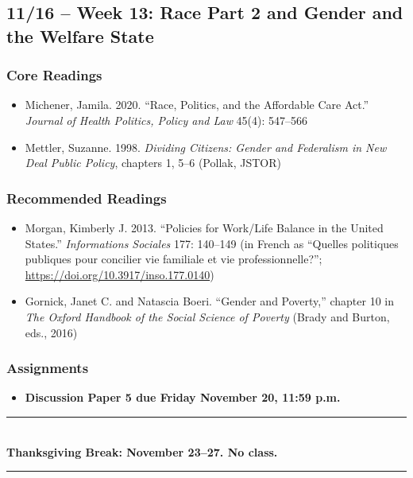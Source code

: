 \documentclass[12pt]{article}
\begin{document}
\subsection*{11/16 -- Week 13: Race Part 2 and Gender and the Welfare State}
    \subsubsection*{Core Readings}
        \begin{itemize}
            \item Michener, Jamila. 2020. ``Race, Politics, and the Affordable Care Act.'' \emph{Journal of Health Politics, Policy and Law} 45(4): 547--566
            \item Mettler, Suzanne. 1998. \emph{Dividing Citizens: Gender and Federalism in New Deal Public Policy}, chapters 1, 5--6 (Pollak, JSTOR)
        \end{itemize}
    \subsubsection*{Recommended Readings}
        \begin{itemize}
            \item Morgan, Kimberly J. 2013. ``Policies for Work/Life Balance in the United States.'' \emph{Informations Sociales} 177: 140--149 (in French as ``Quelles politiques publiques pour concilier vie familiale et vie professionnelle?''; \url{https://doi.org/10.3917/inso.177.0140})
            \item Gornick, Janet C. and Natascia Boeri. ``Gender and Poverty,'' chapter 10 in \emph{The Oxford Handbook of the Social Science of Poverty} (Brady and Burton, eds., 2016)
        \end{itemize}
    \subsubsection*{Assignments}
        \begin{itemize}
            \item \textbf{Discussion Paper 5 due Friday November 20, 11:59 p.m.}
        \end{itemize}

\begin{center}
\vspace{0.5em}
\noindent\rule{0.5\textwidth}{0.4pt}\\[0.25em]
\textbf{Thanksgiving Break: November 23--27. No class.}\\[0.25em]
\noindent\rule{0.5\textwidth}{0.4pt}
\vspace{0.5em}
\end{center}
\end{document}
